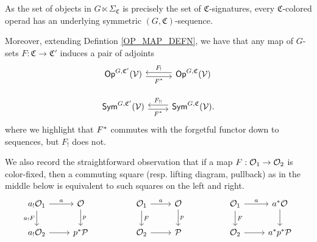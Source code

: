 \documentclass[a4paper,10pt
,draft
]{article}%
\renewcommand{\1}{\ensuremath{\mathbb{id}}}
\begin{document}
\begin{remark}
      \label{COLOR_CHANGE_REM}
      As the set of objects in $G \ltimes \Sigma_{\mathfrak C}$ is precisely the set of $\mathfrak C$-signatures,
      every $\mathfrak C$-colored operad has an underlying symmetric $(G,\mathfrak C)$-sequence.
      
      Moreover, extending Defintion \ref{OP_MAP_DEFN}, we have that any map of $G$-sets
      $F: \mathfrak C \to \mathfrak C'$ induces a pair of adjoints
      \begin{equation}
            \label{COLOR_CHANGE_EQ}
            \begin{tikzcd}
                  \Op^{G, \mathfrak C'}(\V) \arrow[r, shift right, "F^{\**}"'] %
                  &
                  \Op^{G, \mathfrak C}(\V) \arrow[l, shift right, "F_!"'] %
                  \\
                  \Sym^{G, \mathfrak C'}(\V) \arrow[r, shift right, "F^{\**}"']
                  &
                  \Sym^{G, \mathfrak C}(\V) \arrow[l, shift right, "F_{!!}"'].
            \end{tikzcd}
      \end{equation}
      where we highlight that $F^{\**}$ commutes with the forgetful functor down to sequences, but $F_!$ does not.
      
      We also record the straightforward observation that if a map $F: \mathcal{O}_1 \to \mathcal{O}_2$ is color-fixed, then
      a commuting square (resp. lifting diagram, pullback) as in the middle below is
      equivalent to such squares on the left and right.
      \begin{equation}
            \label{COLOR_SQ_EQ}
            \begin{tikzcd}
                  a_! \O_1 \arrow[d, "a_! F"'] \arrow[r, "a"]
                  &
                  \O \arrow[d, "p"]
                  &&
                  \O_1 \arrow[d, "F"] \arrow[r, "a"]
                  &
                  \O \arrow[d, "p"]
                  &&
                  \O_1 \arrow[d, "F"] \arrow[r, "a"]
                  &
                  a^{\**} \O \arrow[d]
                  \\
                  a_! \O_2 \arrow[r]
                  &
                  p^{\**} \P
                  &&
                  \O_2 \arrow[r]
                  &
                  \P
                  &&
                  \O_2 \arrow[r]
                  &
                  a^{\**} p^{\**} \P
            \end{tikzcd}
      \end{equation}
\end{remark}
\end{document}
